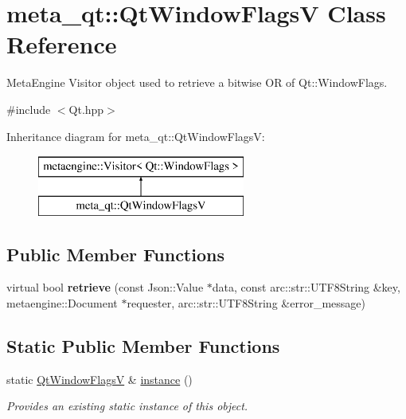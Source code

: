 \hypertarget{classmeta__qt_1_1_qt_window_flags_v}{}\section{meta\+\_\+qt\+:\+:Qt\+Window\+Flags\+V Class Reference}
\label{classmeta__qt_1_1_qt_window_flags_v}


Meta\+Engine Visitor object used to retrieve a bitwise O\+R of Qt\+::\+Window\+Flags.  




{\ttfamily \#include $<$Qt.\+hpp$>$}

Inheritance diagram for meta\+\_\+qt\+:\+:Qt\+Window\+Flags\+V\+:\begin{figure}[H]
\begin{center}
\leavevmode
\includegraphics[height=2.000000cm]{classmeta__qt_1_1_qt_window_flags_v}
\end{center}
\end{figure}
\subsection*{Public Member Functions}
\begin{DoxyCompactItemize}
\item 
\hypertarget{classmeta__qt_1_1_qt_window_flags_v_af1e2dfa687d2eb3868418fb311abdfc7}{}virtual bool {\bfseries retrieve} (const Json\+::\+Value $\ast$data, const arc\+::str\+::\+U\+T\+F8\+String \&key, metaengine\+::\+Document $\ast$requester, arc\+::str\+::\+U\+T\+F8\+String \&error\+\_\+message)\label{classmeta__qt_1_1_qt_window_flags_v_af1e2dfa687d2eb3868418fb311abdfc7}

\end{DoxyCompactItemize}
\subsection*{Static Public Member Functions}
\begin{DoxyCompactItemize}
\item 
\hypertarget{classmeta__qt_1_1_qt_window_flags_v_a02db980ea668500c1d81f7b509f93bf1}{}static \hyperlink{classmeta__qt_1_1_qt_window_flags_v}{Qt\+Window\+Flags\+V} \& \hyperlink{classmeta__qt_1_1_qt_window_flags_v_a02db980ea668500c1d81f7b509f93bf1}{instance} ()\label{classmeta__qt_1_1_qt_window_flags_v_a02db980ea668500c1d81f7b509f93bf1}

\begin{DoxyCompactList}\small\item\em Provides an existing static instance of this object. \end{DoxyCompactList}\end{DoxyCompactItemize}


